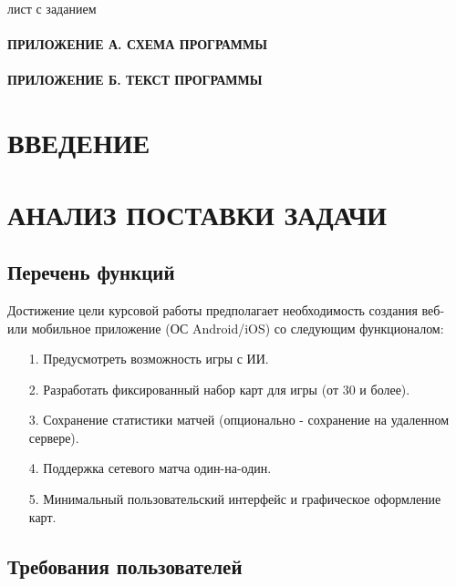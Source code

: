 \documentclass[12pt, a4paper, simple]{eskdtext}
\begin{document}
    

    лист с заданием
    \newpage

    \tableofcontents                                
    \paragraph{ПРИЛОЖЕНИЕ А. СХЕМА ПРОГРАММЫ}
    \paragraph{ПРИЛОЖЕНИЕ Б. ТЕКСТ ПРОГРАММЫ}
    \newpage

    \newpage
    \section*{ВВЕДЕНИЕ}
    \newpage

    \section{АНАЛИЗ ПОСТАВКИ ЗАДАЧИ}
    \subsection{Перечень функций}

    Достижение цели курсовой работы предполагает необходимость создания веб- или мобильное приложение (ОС Android/iOS) со следующим функционалом:
    
    \begin{enumerate}
        \item[1.] Предусмотреть возможность игры с ИИ.
        \item[2.] Разработать фиксированный набор карт для игры (от 30 и более).
        \item[3.] Сохранение статистики матчей (опционально - сохранение на удаленном сервере).
        \item[4.] Поддержка сетевого матча один-на-один.
        \item[5.] Минимальный пользовательский интерфейс и графическое оформление карт.
    \end{enumerate}
    
    \subsection{Требования пользователей}
\end{document}
